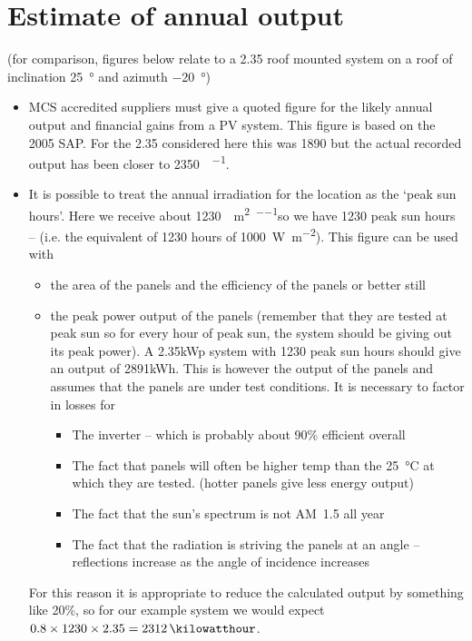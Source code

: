 \documentclass{article}
\begin{document}
\section{Estimate of annual output}
(for comparison, figures below relate to a \SI{2.35}{\kilowattpeak} roof mounted system on a roof of inclination \SI{25}{\degree} and azimuth \SI{-20}{\degree})
\begin{itemize}

\item	MCS accredited suppliers must give a quoted figure for the likely annual output and financial gains from a PV system. This figure is based on the 2005 SAP. For the \SI{2.35}{\kilowattpeak} considered here this was \SI{1890}{\kilowatthour} but the actual recorded output has been closer to \SI{2350}{\kilowatthour\per\year}.
\item	It is possible to treat the annual irradiation for the location as the ‘peak sun hours’. Here we receive about \SI{1230}{\kilowatthour\per\metre\squared\per\year}so we have 1230 peak sun hours – (i.e. the equivalent of 1230 hours of \SI{1000}{\watt\per\metre\squared}). This figure can be used with
\begin{itemize}
\item the area of the panels and the efficiency of the panels or better still
\item the peak power output of the panels (remember that they are tested at peak sun so for every hour of peak sun, the system should be giving out its peak power). A 2.35kWp system with 1230 peak sun hours should give an output of 2891kWh.  This is however the output of the panels and assumes that the panels are under test conditions. It is necessary to factor in losses for
\begin{itemize}
\item The inverter – which is probably about 90\% efficient overall
\item	The fact that panels will often be higher temp than the \SI{25}{\celsius} at which they are tested. (hotter panels give less energy output)
\item	The fact that the sun’s spectrum is not \SI{1.5}[AM]{} all year
\item	The fact that the radiation is striving the panels at an angle – reflections increase as the angle of incidence increases
\end{itemize}
\end{itemize}
For this reason it is appropriate to reduce the calculated output by something like 20\%, so for our example system we would expect $0.8 \times 1230 \times 2.35 = \SI{2312}{\kilowatthour}$.


\end{itemize}
\end{document}
